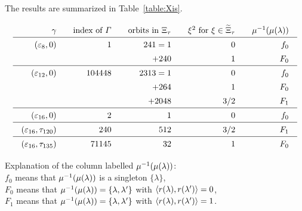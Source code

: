 \documentclass{amsart} %
\begin{document}
%
The results are summarized in Table~\ref{table:Xis}.
%
%
\begin{table}
\[
\setlength{\arraycolsep}{10pt}
\renewcommand{\arraystretch}{1.4}
\begin{array}{rrrrr}
\gamma &\textrm{index of $\vGam$} &\textrm{orbits in $\Xitau$} & \xi^2 \textrm{ for } \xi\in \tilXitau&\mu\inv(\mu(\lambda))\\
\hline 
(\vep_8, 0) &1 & 241= 1 & 0 & f_0 \\
  & & +240 & 1 & F_0 \\
\hline 
(\vep_{12}, 0) &104448 & 2313= 1 & 0 & f_0 \\
  & & +264 & 1 & F_0 \\
  & & +2048 & 3/2 & F_1 \\
 \hline 
(\vep_{16}, 0) &2& 1 & 0 & f_0 \\
\hline 
(\vep_{16},\tauI) &240& 512 & 3/2 & F_1 \\
\hline 
(\vep_{16},\tauII) &71145 & 32 & 1 & F_0 \\  
\end{array}
\]
\vskip 3mm
%
\parbox{12cm}{
Explanation of the column labelled   $\mu^{-1}(\mu(\lambda))$: \\
$f_0$ means that $\mu^{-1}(\mu(\lambda))$ is a singleton $\{\lambda\}$,
\\
$ F_0$ means that $\mu^{-1}(\mu(\lambda))=\{\lambda, \lambda^{\prime}\}$ with $\langle r(\lambda), r(\lambda^{\prime}) \rangle=0$, 
\\
$ F_1$ means that $\mu^{-1}(\mu(\lambda))=\{\lambda, \lambda^{\prime}\}$ with $\langle r(\lambda), r(\lambda^{\prime}) \rangle=1$.
}
%
%
\vskip 5mm
\caption{Index $[\OG(\Lplus, \PPPplus): \vGam]$ and orbit decomposition of walls}\label{table:Xis}
\end{table}
%
\end{document}
